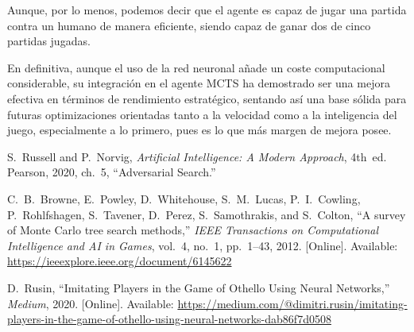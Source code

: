 \documentclass[conference]{IEEEtran}
\begin{document}
Aunque, por lo menos, podemos decir que el agente es capaz de jugar una partida contra un humano de manera eficiente, siendo capaz de ganar dos de cinco partidas jugadas.

En definitiva, aunque el uso de la red neuronal añade un coste computacional considerable, su integración en el agente MCTS ha demostrado ser una mejora efectiva en términos de rendimiento estratégico, sentando así una base sólida para futuras optimizaciones orientadas tanto a la velocidad como a la inteligencia del juego, especialmente a lo primero, pues es lo que más margen de mejora posee.

\begin{thebibliography}{99}

S.~Russell and P.~Norvig, \emph{Artificial Intelligence: A Modern Approach}, 4th~ed. Pearson, 2020, ch.~5, ``Adversarial Search.''

C.~B.~Browne, E.~Powley, D.~Whitehouse, S.~M.~Lucas, P.~I.~Cowling, P.~Rohlfshagen, S.~Tavener, D.~Perez, S.~Samothrakis, and S.~Colton, ``A survey of Monte Carlo tree search methods,'' \emph{IEEE Transactions on Computational Intelligence and AI in Games}, vol.~4, no.~1, pp.~1--43, 2012. [Online]. Available: \url{https://ieeexplore.ieee.org/document/6145622} 

D.~Rusin, ``Imitating Players in the Game of Othello Using Neural Networks,'' \emph{Medium}, 2020. [Online]. Available: \url{https://medium.com/@dimitri.rusin/imitating-players-in-the-game-of-othello-using-neural-networks-dab86f7d0508}

\end{thebibliography}


\end{document}
